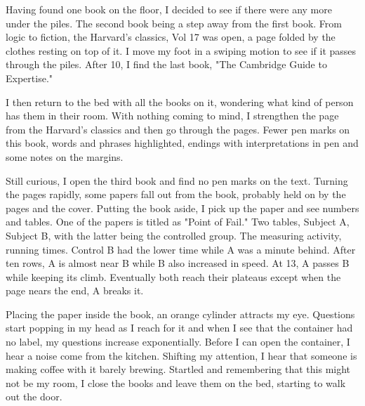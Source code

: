 		Having found one book on the floor, I decided to see if there were any more under the piles. The second book being a step away from the first book.
	From logic to fiction, the Harvard's classics, Vol 17 was open, a page folded by the clothes resting on top of it. I move my foot in a swiping motion to see
	if it passes through the piles. After 10, I find the last book, "The Cambridge Guide to Expertise."

		I then return to the bed with all the books on it, wondering what kind of person has them in their room. With nothing coming to mind, I strengthen the
	page from the Harvard's classics and then go through the pages. Fewer pen marks on this book, words and phrases highlighted, endings with interpretations in
	pen and some notes on the margins.

		Still curious, I open the third book and find no pen marks on the text. Turning the pages rapidly, some papers fall out from the book, probably held
	on by the pages and the cover. Putting the book aside, I pick up the paper and see numbers and tables. One of the papers is titled as "Point of Fail." Two
	tables, Subject A, Subject B, with the latter being the controlled group. The measuring activity, running times. Control B had the lower time while A was a
	minute behind. After ten rows, A is almost near B while B also increased in speed. At 13, A passes B while keeping its climb. Eventually both reach their 
	plateaus except when the page nears the end, A breaks it.

		Placing the paper inside the book, an orange cylinder attracts my eye. Questions start popping in my head as I reach for it and when I see that the
	container had no label, my questions increase exponentially. Before I can open the container, I hear a noise come from the kitchen. Shifting my attention, I
	hear that someone is making coffee with it barely brewing. Startled and remembering that this might not be my room, I close the books and leave them on the
	bed, starting to walk out the door.	
